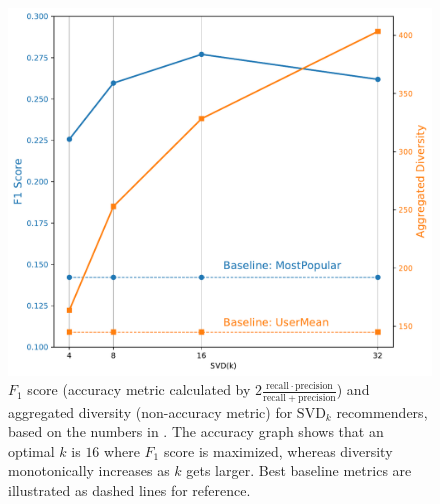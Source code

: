 \begin{figure}[htbp]
    \centering
    \includegraphics[width=1.0\linewidth]{images/tradeoff.pdf}
    \caption{$F_1$ score (accuracy metric calculated by $2 \frac{\mathrm{recall} \cdot \mathrm{precision}}{\mathrm{recall} + \mathrm{precision}}$) and aggregated diversity (non-accuracy metric) for $\mathrm{SVD}_k$ recommenders, based on the numbers in . The accuracy graph shows that an optimal $k$ is $16$ where $F_1$ score is maximized, whereas diversity monotonically increases as $k$ gets larger. Best baseline metrics are illustrated as dashed lines for reference.}
    \label{fig:tradeoff}
\end{figure}

